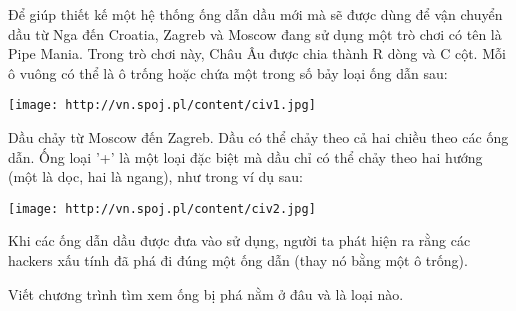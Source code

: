 Để giúp thiết kế một hệ thống ống dẫn dầu mới mà sẽ được dùng để vận chuyển dầu từ Nga đến Croatia, Zagreb và Moscow đang sử dụng một trò chơi có tên là Pipe Mania. Trong trò chơi này, Châu Âu được chia thành R dòng và C cột. Mỗi ô vuông có thể là ô trống hoặc chứa một trong số bảy loại ống dẫn sau:  


\texttt{[image: http://vn.spoj.pl/content/civ1.jpg]}

   Dầu chảy từ Moscow đến Zagreb. Dầu có thể chảy theo cả hai chiều theo các ống dẫn. Ống loại '+' là một loại đặc biệt mà dầu chỉ có thể chảy theo hai hướng (một là dọc, hai là ngang), như trong ví dụ sau:  


\texttt{[image: http://vn.spoj.pl/content/civ2.jpg]}

   Khi các ống dẫn dầu được đưa vào sử dụng, người ta phát hiện ra rằng các hackers xấu tính đã phá đi đúng một ống dẫn (thay nó bằng một ô trống).  

   Viết chương trình tìm xem ống bị phá nằm ở đâu và là loại nào.
